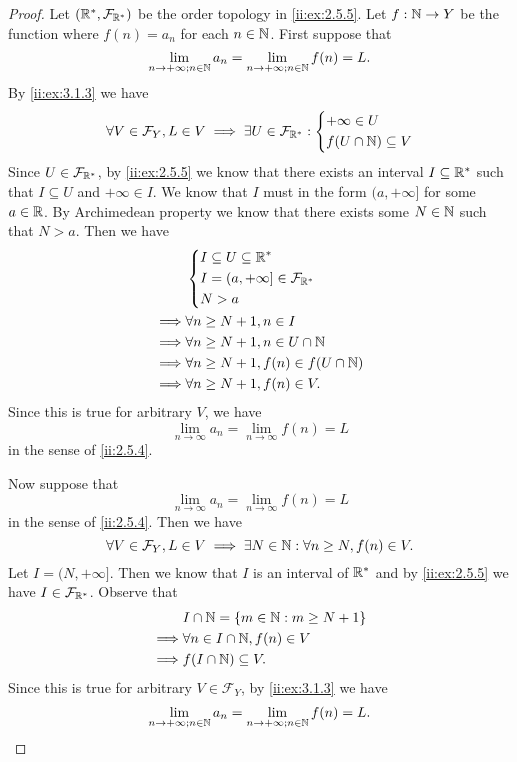 \begin{proof}
  Let \((\mathbb{R}^*, \mathcal{F}_{\mathbb{R}^*})\) be the order topology in \cref{ii:ex:2.5.5}.
  Let \(f : \mathbb{N} \to Y\) be the function where \(f(n) = a_n\) for each \(n \in \mathbb{N}\).
  First suppose that
  \[
    \lim_{n \to +\infty ; n \in \mathbb{N}} a_n = \lim_{n \to +\infty ; n \in \mathbb{N}} f(n) = L.
  \]
  By \cref{ii:ex:3.1.3} we have
  \[
    \forall V \in \mathcal{F}_Y, L \in V \implies \exists U \in \mathcal{F}_{\mathbb{R}^*} : \begin{dcases}
      +\infty \in U \\
      f(U \cap \mathbb{N}) \subseteq V
    \end{dcases}
  \]
  Since \(U \in \mathcal{F}_{\mathbb{R}^*}\), by \cref{ii:ex:2.5.5} we know that there exists an interval \(I \subseteq \mathbb{R}^*\) such that \(I \subseteq U\) and \(+\infty \in I\).
  We know that \(I\) must in the form \((a, +\infty]\) for some \(a \in \mathbb{R}\).
  By Archimedean property we know that there exists some \(N \in \mathbb{N}\) such that \(N > a\).
  Then we have
  \begin{align*}
             & \begin{dcases}
                 I \subseteq U \subseteq \mathbb{R}^*            \\
                 I = (a, +\infty] \in \mathcal{F}_{\mathbb{R}^*} \\
                 N > a
               \end{dcases}     \\
    \implies & \forall n \geq N + 1, n \in I               \\
    \implies & \forall n \geq N + 1, n \in U \cap \mathbb{N}       \\
    \implies & \forall n \geq N + 1, f(n) \in f(U \cap \mathbb{N}) \\
    \implies & \forall n \geq N + 1, f(n) \in V.
  \end{align*}
  Since this is true for arbitrary \(V\), we have
  \[
    \lim_{n \to \infty} a_n = \lim_{n \to \infty} f(n) = L
  \]
  in the sense of \cref{ii:2.5.4}.

  Now suppose that
  \[
    \lim_{n \to \infty} a_n = \lim_{n \to \infty} f(n) = L
  \]
  in the sense of \cref{ii:2.5.4}.
  Then we have
  \[
    \forall V \in \mathcal{F}_Y, L \in V \implies \exists N \in \mathbb{N} : \forall n \geq N, f(n) \in V.
  \]
  Let \(I = (N, +\infty]\).
  Then we know that \(I\) is an interval of \(\mathbb{R}^*\) and by \cref{ii:ex:2.5.5} we have \(I \in \mathcal{F}_{\mathbb{R}^*}\).
  Observe that
  \begin{align*}
             & I \cap \mathbb{N} = \left\lbrace m \in \mathbb{N} : m \geq N + 1\right\rbrace \\
    \implies & \forall n \in I \cap \mathbb{N}, f(n) \in V       \\
    \implies & f(I \cap \mathbb{N}) \subseteq V.
  \end{align*}
  Since this is true for arbitrary \(V \in \mathcal{F}_Y\), by \cref{ii:ex:3.1.3} we have
  \[
    \lim_{n \to +\infty ; n \in \mathbb{N}} a_n = \lim_{n \to +\infty ; n \in \mathbb{N}} f(n) = L.
  \]
\end{proof}

